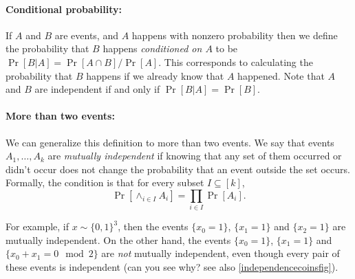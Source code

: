 \hypertarget{disjoint}{}

\paragraph{Conditional probability:} If \(A\) and \(B\) are events, and
\(A\) happens with nonzero probability then we define the probability
that \(B\) happens \emph{conditioned on \(A\)} to be
\(\Pr[B|A] = \Pr[A \cap B]/\Pr[A]\). This corresponds to calculating the
probability that \(B\) happens if we already know that \(A\) happened.
Note that \(A\) and \(B\) are independent if and only if
\(\Pr[B|A]=\Pr[B]\).

\paragraph{More than two events:} We can generalize this definition to
more than two events. We say that events \(A_1,\ldots,A_k\) are
\emph{mutually independent} if knowing that any set of them occurred or
didn't occur does not change the probability that an event outside the
set occurs. Formally, the condition is that for every subset
\(I \subseteq [k]\), \[
\Pr[ \wedge_{i\in I} A_i] =\prod_{i\in I} \Pr[A_i].
\]

For example, if \(x\sim \{0,1\}^3\), then the events \(\{ x_0=1 \}\),
\(\{ x_1 = 1\}\) and \(\{x_2 = 1 \}\) are mutually independent. On the
other hand, the events \(\{x_0 = 1 \}\), \(\{x_1 = 1\}\) and
\(\{ x_0 + x_1 = 0 \mod 2 \}\) are \emph{not} mutually independent, even
though every pair of these events is independent (can you see why? see
also \cref{independencecoinsfig}).


